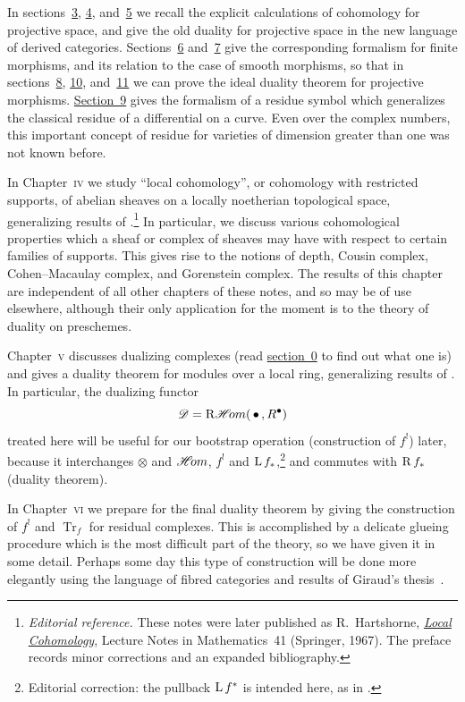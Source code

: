 In sections~\hyperref[sec:3.3]{3}, \hyperref[sec:3.4]{4}, and~\hyperref[sec:3.5]{5} we recall the explicit calculations of cohomology for projective space, and give the old duality for projective space in the new language of derived categories. Sections~\hyperref[sec:3.6]{6} and~\hyperref[sec:3.7]{7} give the corresponding formalism for finite morphisms, and its relation to the case of smooth morphisms, so that in sections~\hyperref[sec:3.8]{8}, \hyperref[sec:3.10]{10}, and~\hyperref[sec:3.11]{11} we can prove the ideal duality theorem for projective morphisms. \hyperref[sec:3.9]{Section~9} gives the formalism of a residue symbol which generalizes the classical residue of a differential on a curve. Even over the complex numbers, this important concept of residue for varieties of dimension greater than one was not known before.

In Chapter~\textsc{iv} we study ``local cohomology'', or cohomology with restricted supports, of abelian sheaves on a locally noetherian topological space, generalizing results of \cite[\nopp \S\S1,3]{LC}.\footnote{\emph{Editorial reference.} These notes were later published as R.~Hartshorne, \href{https://doi.org/10.1007/BFb0073971}{\emph{Local Cohomology}}, Lecture Notes in Mathematics~41 (Springer, 1967). The preface records minor corrections and an expanded bibliography.} In particular, we discuss various cohomological properties which a sheaf or complex of sheaves may have with respect to certain families of supports. This gives rise to the notions of depth, Cousin complex, Cohen--Macaulay complex, and Gorenstein complex. The results of this chapter are independent of all other chapters of these notes, and so may be of use elsewhere, although their only application for the moment is to the theory of duality on preschemes.

Chapter~\textsc{v} discusses dualizing complexes (read \hyperref[sec:5.0]{section~0} to find out what one is) and gives a duality theorem for modules over a local ring, generalizing results of \cite[\nopp \S\S2,4,6]{LC}. In particular, the dualizing functor
\[
\mathscr{D} = \mathop{\mathrm{R}\mathscr{H}\!om}\nolimits(\,\bullet\,, R^{\bullet})
\]
treated here will be useful for our bootstrap operation (construction of $f^{!}$) later, because it interchanges $\otimes$ and $\mathop{\mathscr{H}\!om}\nolimits$, $f^{!}$ and $\operatorname{L} f_{*}$,\footnote{Editorial correction: the pullback $\operatorname{L} f^{*}$ is intended here, as in .} and commutes with $\operatorname{R} f_{*}$ (duality theorem).

In Chapter~\textsc{vi} we prepare for the final duality theorem by giving the construction of $f^{!}$ and $\operatorname{Tr}_{f}$ for residual complexes. This is accomplished by a delicate glueing procedure which is the most difficult part of the theory, so we have given it in some detail. Perhaps some day this type of construction will be done more elegantly using the language of fibred categories and results of Giraud's thesis~\cite{6}.

